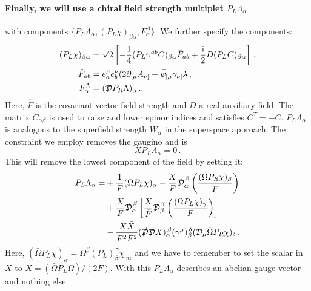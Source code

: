 \documentclass[12pt]{report}
\newcommand{\be}{\begin{equation}}
\newcommand{\ee}{\end{equation}}
\newcommand{\bea}{\begin{equation}\begin{aligned}}
\newcommand{\eea}{\end{aligned}\end{equation}}
\def\rmi{{\rm i}}
\begin{document}
\paragraph{Finally, we will use a chiral field strength multiplet $P_L \Lambda_\alpha$} with components $\{P_L \Lambda_\alpha,(P_L\chi)_{\beta\alpha},F^\Lambda_\alpha\}$. We further specify the components:
\bea 
(P_L\chi)_{\beta\alpha} &= \sqrt{2}\left[-\frac{1}{4} (P_L \gamma^{ab} C)_{\beta \alpha}\hat{F}_{ab} + \frac{\rmi}{2} D(P_LC)_{\beta\alpha}\right]\,,\\
\hat{F}_{ab} &= e^\mu_a e^\nu_b (2 \partial_{[\mu} A_{\nu]} + \bar{\psi}_{[\mu}\gamma_{\nu]}\lambda\,,\\
F_\alpha^\Lambda &= (\slashed{\mathcal{D}}P_R \Lambda)_\alpha\,.
\label{eq:fieldstrencomp}
\eea
Here, $\hat{F}$ is the covariant vector field strength and $D$ a real auxiliary field. The matrix $C_{\alpha\beta}$ is used to raise and lower spinor indices and satisfies $C^T = -C$. $P_L \Lambda_\alpha$ is analogous to the superfield strength $W_\alpha $ in the superspace approach. The constraint we employ removes the gaugino and is
\be 
X P_L \Lambda_\alpha = 0\,.
\label{eq:fermconst}
\ee
This will remove the lowest component of the field by setting it:
\bea
P_L \Lambda_\alpha = &+\frac{1}{F} (\bar{\Omega}P_L\chi)_\alpha - \frac{X}{F} \slashed{\mathcal{D}}_\alpha^{\,\beta} \left(\frac{(\bar{\Omega} P_R\chi)_\beta}{\bar{F}}\right)\\
&+\frac{X}{F}\slashed{\mathcal{D}}_\alpha^{\,\beta} \left[ \frac{\bar{X}}{\bar{F}} \slashed{\mathcal{D}}_\beta^{\,\gamma} \left(\frac{(\bar{\Omega}P_L\chi)_\gamma}{F}\right)\right]\\
&-\frac{X\bar{X}}{F^2\bar{F}^2} (\slashed{\mathcal{D}}\slashed{\mathcal{D}}X)_\alpha^{\,\beta} (\gamma^\mu)_\beta^{\,\delta}(\mathcal{D}_\mu\bar{\Omega}P_R\chi)_\delta\,.
\eea
Here, $(\bar{\Omega}P_L\chi)_\alpha = \Omega^\beta(P_L)_\beta^{\,\gamma} \chi_{\gamma\alpha}$ and we have to remember to set the scalar in $X$ to $X = (\bar{\Omega} P_L \Omega)/(2F)$. With this $P_L \Lambda_\alpha$ describes an abelian gauge vector and nothing else.
\end{document}
